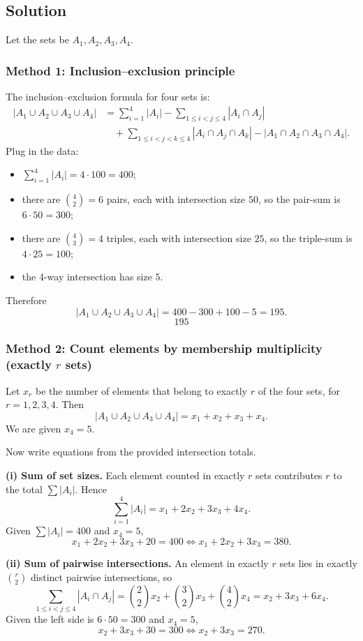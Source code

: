 \documentclass[12pt]{article}
\begin{document}
\subsection{Solution}

Let the sets be $A_1,A_2,A_3,A_4$.

\subsubsection{Method 1: Inclusion--exclusion principle}
The inclusion--exclusion formula for four sets is:
\begin{align*}
\left|A_1\cup A_2\cup A_3\cup A_4\right|
&=\sum_{i=1}^{4}|A_i|
 -\sum_{1\le i<j\le 4}|A_i\cap A_j|\\
&\quad+\sum_{1\le i<j<k\le 4}|A_i\cap A_j\cap A_k|
 -|A_1\cap A_2\cap A_3\cap A_4|.
\end{align*}
Plug in the data:
\begin{itemize}[leftmargin=*]
\item $\sum_{i=1}^{4}|A_i|=4\cdot 100=400$;
\item there are $\binom{4}{2}=6$ pairs, each with intersection size $50$, so the pair-sum is $6\cdot 50=300$;
\item there are $\binom{4}{3}=4$ triples, each with intersection size $25$, so the triple-sum is $4\cdot 25=100$;
\item the 4-way intersection has size $5$.
\end{itemize}
Therefore
\[
|A_1\cup A_2\cup A_3\cup A_4|=400-300+100-5=195.
\]
\[
\boxed{195}
\]

\subsubsection{Method 2: Count elements by membership multiplicity (exactly $r$ sets)}
Let $x_r$ be the number of elements that belong to exactly $r$ of the four sets, for $r=1,2,3,4$.
Then
\[
|A_1\cup A_2\cup A_3\cup A_4|=x_1+x_2+x_3+x_4.
\]
We are given $x_4=5$.

Now write equations from the provided intersection totals.

\medskip
\noindent\textbf{(i) Sum of set sizes.}
Each element counted in exactly $r$ sets contributes $r$ to the total $\sum|A_i|$. Hence
\[
\sum_{i=1}^{4}|A_i|=x_1+2x_2+3x_3+4x_4.
\]
Given $\sum|A_i|=400$ and $x_4=5$,
\[
x_1+2x_2+3x_3+20=400 \iff x_1+2x_2+3x_3=380.
\]

\medskip
\noindent\textbf{(ii) Sum of pairwise intersections.}
An element in exactly $r$ sets lies in exactly $\binom{r}{2}$ distinct pairwise intersections, so
\[
\sum_{1\le i<j\le 4}|A_i\cap A_j|=\binom{2}{2}x_2+\binom{3}{2}x_3+\binom{4}{2}x_4=x_2+3x_3+6x_4.
\]
Given the left side is $6\cdot 50=300$ and $x_4=5$,
\[
x_2+3x_3+30=300 \iff x_2+3x_3=270.
\]
\end{document}
